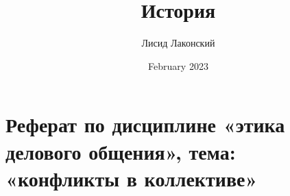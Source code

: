 \documentclass{article}
\title{История}
\author{Лисид Лаконский}
\date{February 2023}
\begin{document}
\raggedright

\maketitle
\tableofcontents
\pagebreak

\section{Реферат по дисциплине «этика делового общения», тема: «конфликты в коллективе»}
\end{document}
